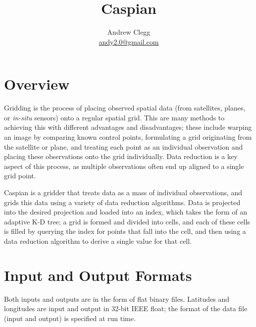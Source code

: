\documentclass[a4paper,12pt]{article}
\title{Caspian}
\author{Andrew Clegg\\\href{mailto:andy2.0@gmail.com}{andy2.0@gmail.com}}
\begin{document}
\maketitle
{}
\tableofcontents
\section{Overview}
Gridding is the process of placing observed spatial data (from satellites, planes, or \textit{in-situ} sensors) onto a regular spatial grid. This are many methods to achieving this with different advantages and disadvantages; these include warping an image by comparing known control points, formulating a grid originating from the satellite or plane, and treating each point as an individual observation and placing these observations onto the grid individually. Data reduction is a key aspect of this process, as multiple observations often end up aligned to a single grid point.

Caspian is a gridder that treats data as a mass of individual observations, and grids this data using a variety of data reduction algorithms. Data is projected into the desired projection and loaded into an index, which takes the form of an adaptive K-D tree; a grid is formed and divided into cells, and each of these cells is filled by querying the index for points that fall into the cell, and then using a data reduction algorithm to derive a single value for that cell.

\section{Input and Output Formats}
Both inputs and outputs are in the form of flat binary files. Latitudes and longitudes are input and output in 32-bit IEEE float; the format of the data file (input and output) is specified at run time.
\end{document}
